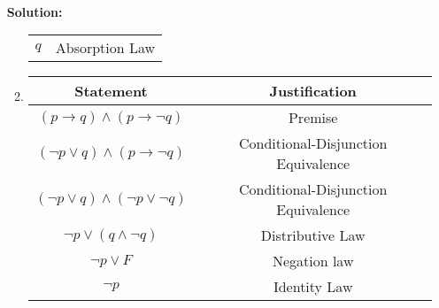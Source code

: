 \documentclass{article}
\newenvironment{solution}
{
\par
\color{blue}
\vspace{2mm}
\hline \\
\textbf{Solution:}
}
{
\vspace{2mm}
\newpage
}
\begin{document}
\begin{enumerate}
\begin{solution}
\begin{enumerate}
\begin{tabular}{c|c}
        $q$ & Absorption Law\\
        \end{tabular}
        \item
        \begin{tabular}{c|c}
        Statement & Justification\\
        \hline
        $(p \rightarrow q) \wedge (p \rightarrow \lnot q)$ & Premise\\
        $(\neg p \lor q) \land (p \rightarrow \neg q)$ & Conditional-Disjunction Equivalence \\
        $(\neg p \lor q) \land (\neg p\lor \neg q )$ & Conditional-Disjunction Equivalence \\
        $\neg p \lor (q \land \neg q)$ & Distributive Law \\
        $\neg p \lor F$ & Negation law\\
        $\neg p$ & Identity Law\\
        \end{tabular}
    \end{enumerate}
    \end{solution}
    

\end{enumerate}
\end{document}
